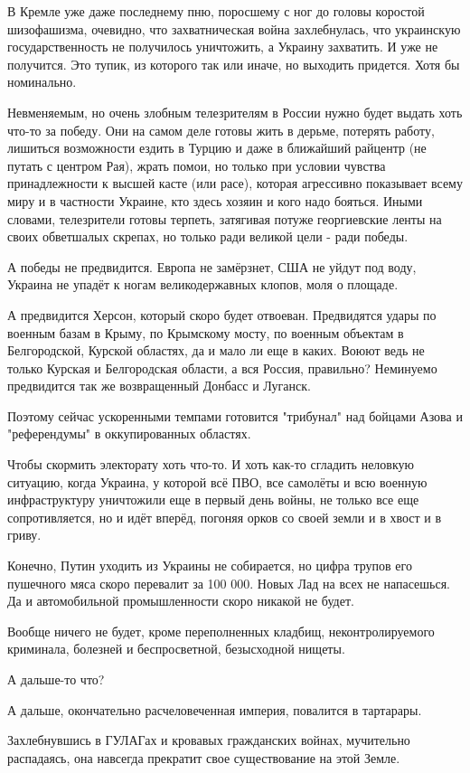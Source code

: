  
 
 
 
 

В Кремле уже даже последнему пню, поросшему с ног до головы коростой
шизофашизма, очевидно, что захватническая война захлебнулась, что украинскую
государственность не получилось уничтожить, а Украину захватить. И уже не
получится. Это тупик, из которого так или иначе, но выходить придется. Хотя бы
номинально.

Невменяемым, но очень злобным телезрителям в России нужно будет выдать хоть
что-то за победу. Они на самом деле готовы жить в дерьме, потерять работу,
лишиться возможности ездить в Турцию и даже в ближайший райцентр (не путать с
центром Рая), жрать помои, но только при условии чувства принадлежности к
высшей касте (или расе), которая агрессивно показывает всему миру и в частности
Украине, кто здесь хозяин и кого надо бояться. Иными словами, телезрители
готовы терпеть, затягивая потуже георгиевские ленты на своих обветшалых
скрепах, но только ради великой цели - ради победы.

А победы не предвидится. Европа не замёрзнет, США не уйдут под воду, Украина не
упадёт к ногам великодержавных клопов, моля о площаде.

А предвидится Херсон, который скоро будет отвоеван. Предвидятся удары по
военным базам в Крыму, по Крымскому мосту, по военным объектам в Белгородской,
Курской областях, да и мало ли еще в каких. Воюют ведь не только Курская и
Белгородская области, а вся Россия, правильно? Неминуемо предвидится так же
возвращенный Донбасс и Луганск.

Поэтому сейчас ускоренными темпами готовится "трибунал" над бойцами Азова и
"референдумы" в оккупированных областях.

Чтобы скормить электорату хоть что-то. И хоть как-то сгладить неловкую
ситуацию, когда Украина, у которой всё ПВО, все самолёты и всю военную
инфраструктуру уничтожили еще в первый день войны, не только все еще
сопротивляется, но и идёт вперёд, погоняя орков со своей земли и в хвост и в
гриву.

Конечно, Путин уходить из Украины не собирается, но цифра трупов его пушечного
мяса скоро перевалит за 100 000. Новых Лад на всех не напасешься. Да и
автомобильной промышленности скоро никакой не будет.

Вообще ничего не будет, кроме переполненных кладбищ, неконтролируемого
криминала, болезней и беспросветной, безысходной нищеты.

А дальше-то что?

А дальше, окончательно расчеловеченная империя, повалится в тартарары.

Захлебнувшись в ГУЛАГах и кровавых гражданских войнах, мучительно распадаясь,
она навсегда прекратит свое существование на этой Земле.

